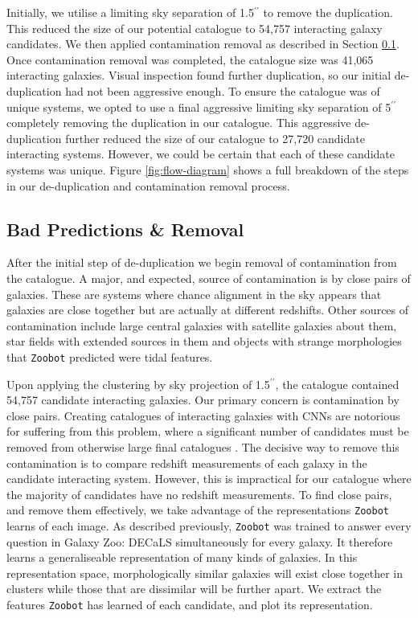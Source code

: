 Initially, we utilise a limiting sky separation of 1.5$^{\prime\prime}$ to remove the duplication. This reduced the size of our potential catalogue to 54,757 interacting galaxy candidates. We then applied contamination removal as described in Section \ref{bad_pred}. Once contamination removal was completed, the catalogue size was 41,065 interacting galaxies. Visual inspection found further duplication, so our initial de-duplication had not been aggressive enough. To ensure the catalogue was of unique systems, we opted to use a final aggressive limiting sky separation of 5$^{\prime\prime}$ completely removing the duplication in our catalogue. This aggressive de-duplication further reduced the size of our catalogue to 27,720 candidate interacting systems. However, we could be certain that each of these candidate systems was unique. Figure \ref{fig:flow-diagram} shows a full breakdown of the steps in our de-duplication and contamination removal process.

\subsection{Bad Predictions \& Removal}\label{bad_pred}
\noindent After the initial step of de-duplication we begin removal of contamination from the catalogue. A major, and expected, source of contamination is by close pairs of galaxies. These are systems where chance alignment in the sky appears that galaxies are close together but are actually at different redshifts. Other sources of contamination include large central galaxies with satellite galaxies about them, star fields with extended sources in them and objects with strange morphologies that \texttt{Zoobot} predicted were tidal features.

Upon applying the clustering by sky projection of 1.5$^{\prime\prime}$, the catalogue contained 54,757 candidate interacting galaxies. Our primary concern is contamination by close pairs. Creating catalogues of interacting galaxies with CNNs are notorious for suffering from this problem, where a significant number of candidates must be removed from otherwise large final catalogues \citep{2019MNRAS.490.5390B, 2022A&A...661A..52P}. The decisive way to remove this contamination is to compare redshift measurements of each galaxy in the candidate interacting system. However, this is impractical for our catalogue where the majority of candidates have no redshift measurements. To find close pairs, and remove them effectively, we take advantage of the representations \texttt{Zoobot} learns of each image. As described previously, \texttt{Zoobot} was trained to answer every question in Galaxy Zoo: DECaLS simultaneously for every galaxy. It therefore learns a generaliseable representation of many kinds of galaxies. In this representation space, morphologically similar galaxies will exist close together in clusters while those that are dissimilar will be further apart. We extract the features \texttt{Zoobot} has learned of each candidate, and plot its representation.

